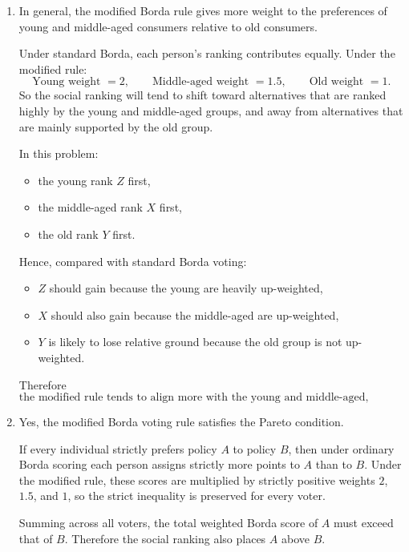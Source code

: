 \documentclass[12pt]{article}
\begin{document}
\begin{enumerate}[label=(\alph*)]
    \item
    In general, the modified Borda rule gives more weight to the preferences of young and middle-aged consumers relative to old consumers.

    Under standard Borda, each person's ranking contributes equally. Under the modified rule:
    \[
    \text{Young weight }=2,
    \qquad
    \text{Middle-aged weight }=1.5,
    \qquad
    \text{Old weight }=1.
    \]
    So the social ranking will tend to shift toward alternatives that are ranked highly by the young and middle-aged groups, and away from alternatives that are mainly supported by the old group.

    In this problem:
    \begin{itemize}[leftmargin=*]
        \item the young rank \(Z\) first,
        \item the middle-aged rank \(X\) first,
        \item the old rank \(Y\) first.
    \end{itemize}

    Hence, compared with standard Borda voting:
    \begin{itemize}[leftmargin=*]
        \item \(Z\) should gain because the young are heavily up-weighted,
        \item \(X\) should also gain because the middle-aged are up-weighted,
        \item \(Y\) is likely to lose relative ground because the old group is not up-weighted.
    \end{itemize}

    Therefore
    \[
    \boxed{\text{the modified rule tends to align more with the young and middle-aged, especially the young.}}
    \]

    \item
    Yes, the modified Borda voting rule satisfies the Pareto condition.

    If every individual strictly prefers policy \(A\) to policy \(B\), then under ordinary Borda scoring each person assigns strictly more points to \(A\) than to \(B\). Under the modified rule, these scores are multiplied by strictly positive weights \(2\), \(1.5\), and \(1\), so the strict inequality is preserved for every voter.

    Summing across all voters, the total weighted Borda score of \(A\) must exceed that of \(B\). Therefore the social ranking also places \(A\) above \(B\).


\end{enumerate}
\end{document}
